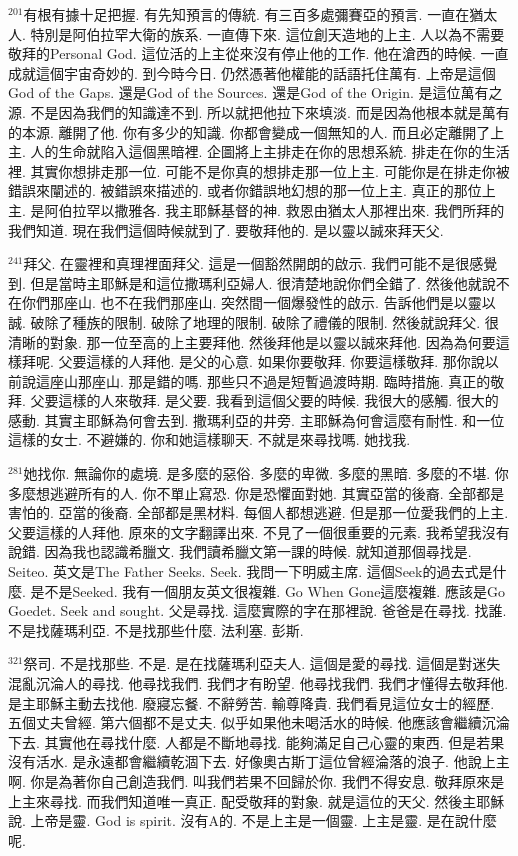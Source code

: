\documentclass{book}
\begin{document}
$^{201}$有根有據十足把握.
有先知預言的傳統.
有三百多處彌賽亞的預言.
一直在猶太人.
特別是阿伯拉罕大衛的族系.
一直傳下來.
這位創天造地的上主.
人以為不需要敬拜的Personal God.
這位活的上主從來沒有停止他的工作.
他在滄西的時候.
一直成就這個宇宙奇妙的.
到今時今日.
仍然憑著他權能的話語托住萬有.
上帝是這個God of the Gaps.
還是God of the Sources.
還是God of the Origin.
是這位萬有之源.
不是因為我們的知識達不到.
所以就把他拉下來填淡.
而是因為他根本就是萬有的本源.
離開了他.
你有多少的知識.
你都會變成一個無知的人.
而且必定離開了上主.
人的生命就陷入這個黑暗裡.
企圖將上主排走在你的思想系統.
排走在你的生活裡.
其實你想排走那一位.
可能不是你真的想排走那一位上主.
可能你是在排走你被錯誤來闡述的.
被錯誤來描述的.
或者你錯誤地幻想的那一位上主.
真正的那位上主.
是阿伯拉罕以撒雅各.
我主耶穌基督的神.
救恩由猶太人那裡出來.
我們所拜的我們知道.
現在我們這個時候就到了.
要敬拜他的.
是以靈以誠來拜天父.

$^{241}$拜父.
在靈裡和真理裡面拜父.
這是一個豁然開朗的啟示.
我們可能不是很感覺到.
但是當時主耶穌是和這位撒瑪利亞婦人.
很清楚地說你們全錯了.
然後他就說不在你們那座山.
也不在我們那座山.
突然間一個爆發性的啟示.
告訴他們是以靈以誠.
破除了種族的限制.
破除了地理的限制.
破除了禮儀的限制.
然後就說拜父.
很清晰的對象.
那一位至高的上主要拜他.
然後拜他是以靈以誠來拜他.
因為為何要這樣拜呢.
父要這樣的人拜他.
是父的心意.
如果你要敬拜.
你要這樣敬拜.
那你說以前說這座山那座山.
那是錯的嗎.
那些只不過是短暫過渡時期.
臨時措施.
真正的敬拜.
父要這樣的人來敬拜.
是父要.
我看到這個父要的時候.
我很大的感觸.
很大的感動.
其實主耶穌為何會去到.
撒瑪利亞的井旁.
主耶穌為何會這麼有耐性.
和一位這樣的女士.
不避嫌的.
你和她這樣聊天.
不就是來尋找嗎.
她找我.

$^{281}$她找你.
無論你的處境.
是多麼的惡俗.
多麼的卑微.
多麼的黑暗.
多麼的不堪.
你多麼想逃避所有的人.
你不單止寫恐.
你是恐懼面對她.
其實亞當的後裔.
全部都是害怕的.
亞當的後裔.
全部都是黑材料.
每個人都想逃避.
但是那一位愛我們的上主.
父要這樣的人拜他.
原來的文字翻譯出來.
不見了一個很重要的元素.
我希望我沒有說錯.
因為我也認識希臘文.
我們讀希臘文第一課的時候.
就知道那個尋找是.
Seiteo.
英文是The Father Seeks.
Seek.
我問一下明威主席.
這個Seek的過去式是什麼.
是不是Seeked.
我有一個朋友英文很複雜.
Go When Gone這麼複雜.
應該是Go Goedet.
Seek and sought.
父是尋找.
這麼實際的字在那裡說.
爸爸是在尋找.
找誰.
不是找薩瑪利亞.
不是找那些什麼.
法利塞.
彭斯.

$^{321}$祭司.
不是找那些.
不是.
是在找薩瑪利亞夫人.
這個是愛的尋找.
這個是對迷失混亂沉淪人的尋找.
他尋找我們.
我們才有盼望.
他尋找我們.
我們才懂得去敬拜他.
是主耶穌主動去找他.
廢寢忘餐.
不辭勞苦.
輸尊降貴.
我們看見這位女士的經歷.
五個丈夫曾經.
第六個都不是丈夫.
似乎如果他未喝活水的時候.
他應該會繼續沉淪下去.
其實他在尋找什麼.
人都是不斷地尋找.
能夠滿足自己心靈的東西.
但是若果沒有活水.
是永遠都會繼續乾涸下去.
好像奧古斯丁這位曾經淪落的浪子.
他說上主啊.
你是為著你自己創造我們.
叫我們若果不回歸於你.
我們不得安息.
敬拜原來是上主來尋找.
而我們知道唯一真正.
配受敬拜的對象.
就是這位的天父.
然後主耶穌說.
上帝是靈.
God is spirit.
沒有A的.
不是上主是一個靈.
上主是靈.
是在說什麼呢.
\end{document}
